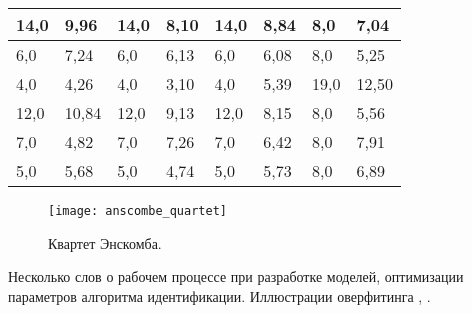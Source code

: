 \begin{table}[!htp]
\begin{tabular}{|ll|ll|ll|ll|}
			\multicolumn{1}{|l|}{14,0} & 9,96                   & \multicolumn{1}{l|}{14,0} & 8,10                   & \multicolumn{1}{l|}{14,0} & 8,84                   & \multicolumn{1}{l|}{8,0}  & 7,04                   \\ \hline
			\multicolumn{1}{|l|}{6,0}  & 7,24                   & \multicolumn{1}{l|}{6,0}  & 6,13                   & \multicolumn{1}{l|}{6,0}  & 6,08                   & \multicolumn{1}{l|}{8,0}  & 5,25                   \\ \hline
			\multicolumn{1}{|l|}{4,0}  & 4,26                   & \multicolumn{1}{l|}{4,0}  & 3,10                   & \multicolumn{1}{l|}{4,0}  & 5,39                   & \multicolumn{1}{l|}{19,0} & 12,50                  \\ \hline
			\multicolumn{1}{|l|}{12,0} & 10,84                  & \multicolumn{1}{l|}{12,0} & 9,13                   & \multicolumn{1}{l|}{12,0} & 8,15                   & \multicolumn{1}{l|}{8,0}  & 5,56                   \\ \hline
			\multicolumn{1}{|l|}{7,0}  & 4,82                   & \multicolumn{1}{l|}{7,0}  & 7,26                   & \multicolumn{1}{l|}{7,0}  & 6,42                   & \multicolumn{1}{l|}{8,0}  & 7,91                   \\ \hline
			\multicolumn{1}{|l|}{5,0}  & 5,68                   & \multicolumn{1}{l|}{5,0}  & 4,74                   & \multicolumn{1}{l|}{5,0}  & 5,73                   & \multicolumn{1}{l|}{8,0}  & 6,89                   \\ \hline
		\end{tabular}
		\label{table:anscombe_quartet}
	\end{table}

    \begin{figure}[!htp]
        \centering
        \texttt{[image: anscombe\_quartet]}
        \caption{Квартет Энскомба.}
        \label{pic:anscombe_quartet}
    \end{figure}

    Несколько слов о рабочем процессе при разработке моделей, оптимизации 
    параметров алгоритма идентификации.	Иллюстрации оверфитинга 
    \cite{hands_on_ml}, \cite{sklearn_cross_validation}.